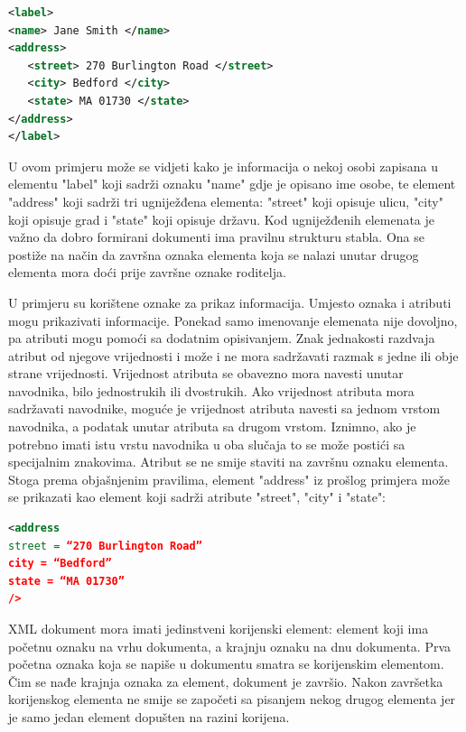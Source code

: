\documentclass{foi}
\begin{document}
\begin{lstlisting}[language=XML]
<label>
<name> Jane Smith </name>
<address>
   <street> 270 Burlington Road </street>
   <city> Bedford </city>
   <state> MA 01730 </state>
</address>
</label>
\end{lstlisting}

U ovom primjeru može se vidjeti kako je informacija o nekoj osobi zapisana u elementu  "label" koji sadrži oznaku "name" gdje je opisano ime osobe, te element "address" koji sadrži tri ugniježđena elementa: "street" koji opisuje ulicu, "city" koji opisuje grad i "state" koji opisuje državu. Kod ugniježđenih elemenata je važno da dobro formirani dokumenti ima pravilnu strukturu stabla. Ona se postiže na način da završna oznaka elementa koja se nalazi unutar drugog elementa mora doći prije završne oznake roditelja.

U primjeru su korištene oznake za prikaz informacija. Umjesto oznaka i atributi mogu prikazivati informacije. Ponekad samo imenovanje elemenata nije dovoljno, pa atributi mogu pomoći sa dodatnim opisivanjem. Znak jednakosti razdvaja atribut od njegove vrijednosti i može i ne mora sadržavati razmak s jedne ili obje strane vrijednosti. Vrijednost atributa se obavezno mora navesti unutar navodnika, bilo jednostrukih ili dvostrukih. Ako vrijednost atributa mora sadržavati navodnike, moguće je vrijednost atributa navesti sa jednom vrstom navodnika, a podatak unutar atributa sa drugom vrstom. Iznimno, ako je potrebno imati istu vrstu navodnika u oba slučaja to se može postići sa specijalnim znakovima. Atribut se ne smije staviti na završnu oznaku elementa. Stoga prema objašnjenim pravilima, element "address" iz prošlog primjera može se prikazati kao element koji sadrži atribute "street", "city" i "state": \cite{xmlDatabase}

\begin{lstlisting}[language=XML]
<address
street = “270 Burlington Road”
city = “Bedford”
state = “MA 01730”
/>
\end{lstlisting}

XML dokument mora imati jedinstveni korijenski element: element koji ima početnu oznaku na vrhu dokumenta, a krajnju oznaku na dnu dokumenta. Prva početna oznaka koja se napiše u dokumentu smatra se korijenskim elementom. Čim se nađe krajnja oznaka za element, dokument je završio. Nakon završetka korijenskog elementa ne smije se započeti sa pisanjem nekog drugog elementa jer je samo jedan element dopušten na razini korijena.
\end{document}
